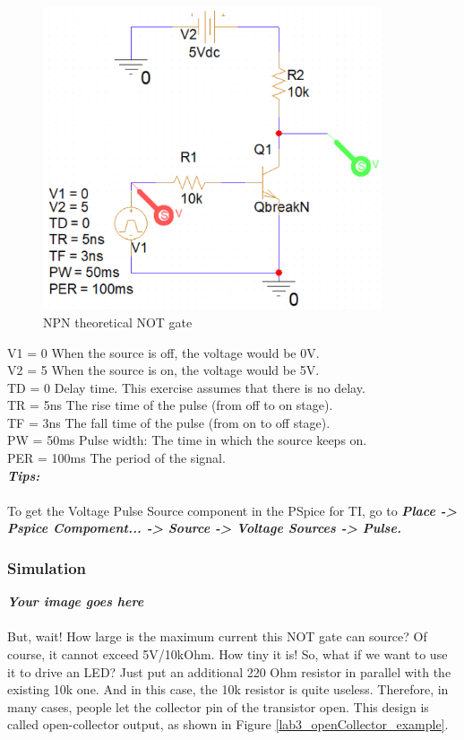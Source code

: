 \begin{figure}[H]
    \centering
    \includegraphics[width=10cm]{source/picture/bai_3/lab3_notGate_de.png}
    \caption{NPN theoretical NOT gate}
    \label{lab3_notGate_de}
\end{figure}

V1 = 0  When the source is off, the voltage would be 0V.\\
V2 = 5  When the source is on, the voltage would be 5V.\\
TD = 0  Delay time. This exercise assumes that there is no delay.\\
TR = 5ns  The rise time of the pulse (from off to on stage).\\
TF = 3ns  The fall time of the pulse (from on to off stage).\\
PW = 50ms  Pulse width: The time in which the source keeps on.\\
PER = 100ms  The period of the signal.\\

\textbf{\textit{Tips:}}\\
\\
To get the Voltage Pulse Source component in the PSpice for TI, go to \textbf{\textit{Place -> Pspice Compoment... -> Source -> Voltage Sources -> Pulse.}}

\newpage

\subsubsection{Simulation}
\textbf{\textit{Your image goes here}}\\
\vspace{8cm}
\\
But, wait! How large is the maximum current this NOT gate can source? Of course, it cannot exceed 5V/10kOhm. How tiny it is! So, what if we want to use it to drive an LED? Just put an additional 220 Ohm resistor in parallel with the existing 10k one. And in this case, the 10k resistor is quite useless. Therefore, in many cases, people let the collector pin of the transistor open. This design is called open-collector output, as shown in Figure \ref{lab3_openCollector_example}.

